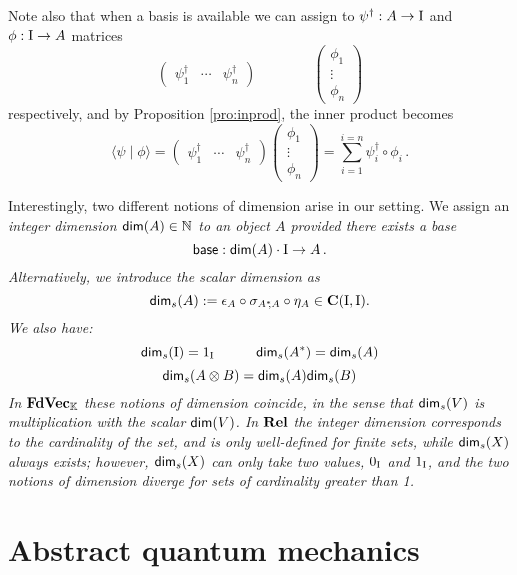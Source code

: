 \documentclass[10pt]{article}
\begin{document}
\noindent Note also that when a basis is available we can assign to $\psi^\dagger:A\to {\rm I}$ and $\phi:{\rm I}\to A$
matrices
\[
\left(
\begin{array}{ccc}
\psi_1^\dagger&
\cdots&
\psi_n^\dagger
\end{array}
\right)
\qquad\qquad
\left(
\begin{array}{c}
\phi_1\\
\vdots\\
\phi_n
\end{array}
\right)
\]
respectively, and by Proposition \ref{pro:inprod}, the
inner product becomes
\[
\langle \psi \mid \phi \rangle =\left(
\begin{array}{ccc}
\psi_1^\dagger&
\cdots&
\psi_n^\dagger
\end{array}
\right)
\left(
\begin{array}{c}
\phi_1\\
\vdots\\
\phi_n
\end{array}
\right)
=\sum_{i=1}^{i=n}\psi_i^\dagger\circ\phi_i\,. 
\]

Interestingly, two different notions of dimension arise in our setting.  We
assign an \em integer dimension \em ${\sf dim}(A)\in\mathbb{N}$ to an object
$A$ provided there exists a base 
\[
{\sf base}:{\sf dim}(A)\cdot{\rm I}\to A\,.
\] 
Alternatively, we introduce the \em scalar dimension \em as
\[
{\sf dim}_s(A):=\epsilon_A\circ\sigma_{A^*\!\!,A}\circ\eta_A\in{\bf C}({\rm I},{\rm I}) .
\]
We also have:
\[
{\sf dim}_s({\rm I})=1_{\rm I}
\qquad\quad
{\sf dim}_s(A^*)={\sf dim}_s(A)
\]
\[
{\sf dim}_s(A\otimes B)={\sf dim}_s(A){\sf dim}_s(B)
\]
In ${\bf FdVec}_\mathbb{K}$ these notions of dimension coincide, in the sense that ${\sf dim}_s(V)$ is multiplication with the
scalar
${\sf dim}(V)$. In ${\bf Rel}$ the integer dimension corresponds to the cardinality of the set, and is only well-defined for finite sets, while ${\sf
dim}_s(X)$ always exists;  however,  ${\sf
dim}_s(X)$ can only take two values, $0_{\rm I}$ and $1_{\rm I}$, and the two notions of dimension diverge for sets of cardinality greater than 1. 



\section{Abstract quantum mechanics}\label{sec:absquantprot}  
\end{document}
